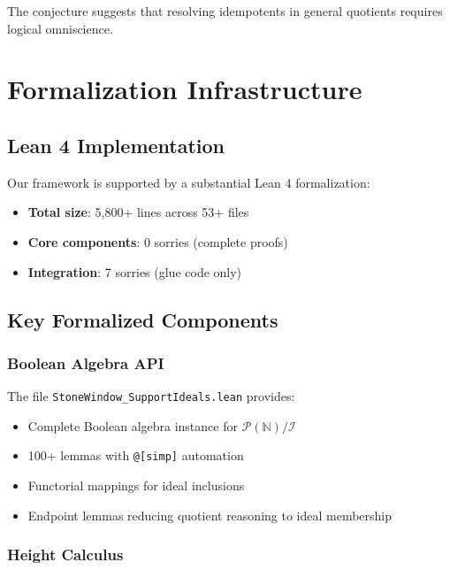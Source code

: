 \documentclass[11pt]{article}
\newcommand{\N}{\mathbb{N}}
\begin{document}
The conjecture suggests that resolving idempotents in general quotients requires logical omniscience.

\section{Formalization Infrastructure}

\subsection{Lean 4 Implementation}

Our framework is supported by a substantial Lean 4 formalization:

\begin{itemize}
\item \textbf{Total size}: 5,800+ lines across 53+ files
\item \textbf{Core components}: 0 sorries (complete proofs)
\item \textbf{Integration}: 7 sorries (glue code only)
\end{itemize}

\subsection{Key Formalized Components}

\subsubsection{Boolean Algebra API}

The file \texttt{StoneWindow\_SupportIdeals.lean} provides:
\begin{itemize}
\item Complete Boolean algebra instance for $\mathcal{P}(\N)/\mathcal{I}$
\item 100+ lemmas with \texttt{@[simp]} automation
\item Functorial mappings for ideal inclusions
\item Endpoint lemmas reducing quotient reasoning to ideal membership
\end{itemize}

\subsubsection{Height Calculus}
\end{document}
